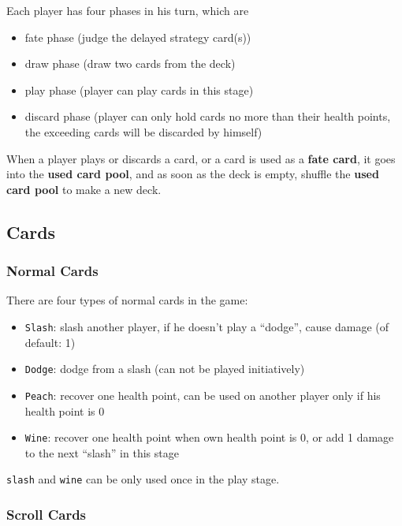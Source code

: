 \documentclass[11pt,a4paper]{article}
\begin{document}
Each player has four phases in his turn, which are
\begin{itemize}
\item fate phase (judge the delayed strategy card(s))
\item draw phase (draw two cards from the deck)
\item play phase (player can play cards in this stage)
\item discard phase (player can only hold cards no more than their health points, the exceeding cards will be discarded by himself)
\end{itemize}

When a player plays or discards a card, or a card is used as a \textbf{fate card}, it goes into the \textbf{used card pool}, and as soon as the deck is empty, shuffle the \textbf{used card pool} to make a new deck. \bigskip

\subsection{Cards}

\subsubsection{Normal Cards}

There are four types of normal cards in the game:
\begin{itemize}
\item \texttt{Slash}: slash another player, if he doesn't play a ``dodge'', cause damage (of default: 1)
\item \texttt{Dodge}: dodge from a slash (can not be played initiatively)
\item \texttt{Peach}: recover one health point, can be used on another player only if his health point is 0
\item \texttt{Wine}: recover one health point when own health point is 0, or add 1 damage to the next ``slash'' in this stage
\end{itemize}

\texttt{slash} and \texttt{wine} can be only used once in the play stage.

\subsubsection{Scroll Cards}
\end{document}
